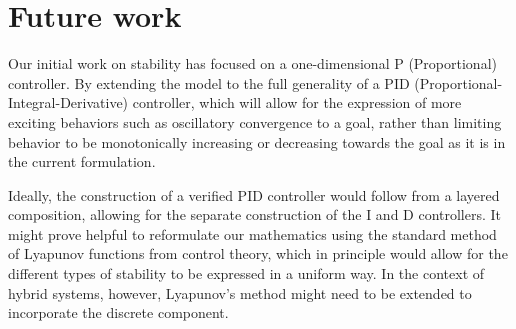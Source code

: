 \documentclass[preprint,nocopyrightspace]{sigplanconf}
\begin{document}







\section{Future work}

Our initial work on stability has focused on a one-dimensional P (Proportional) controller. By extending the model to the full generality of a PID (Proportional-Integral-Derivative) controller, which will allow for the expression of more exciting behaviors such as oscillatory convergence to a goal, rather than limiting behavior to be monotonically increasing or decreasing towards the goal as it is in the current formulation.

Ideally, the construction of a verified PID controller would follow from a layered composition, allowing for the separate construction of the I and D controllers. It might prove helpful to reformulate our mathematics using the standard method of Lyapunov functions from control theory, which in principle would allow for the different types of stability to be expressed in a uniform way. In the context of hybrid systems, however, Lyapunov's method might need to be extended to incorporate the discrete component.


\end{document}

